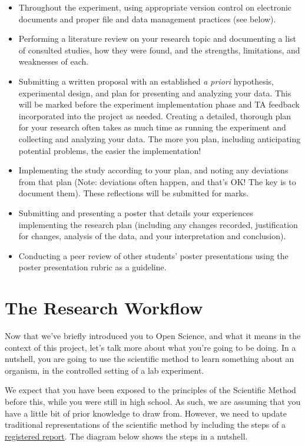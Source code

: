 \documentclass[
]{book}
\providecommand{\tightlist}{%
  \setlength{\itemsep}{0pt}\setlength{\parskip}{0pt}}
\begin{document}
\begin{itemize}
\tightlist
\item
  Throughout the experiment, using appropriate version control on electronic documents and proper file and data management practices (see below).
\item
  Performing a literature review on your research topic and documenting a list of consulted studies, how they were found, and the strengths, limitations, and weaknesses of each.
\item
  Submitting a written proposal with an established \emph{a priori} hypothesis, experimental design, and plan for presenting and analyzing your data. This will be marked before the experiment implementation phase and TA feedback incorporated into the project as needed. Creating a detailed, thorough plan for your research often takes as much time as running the experiment and collecting and analyzing your data. The more you plan, including anticipating potential problems, the easier the implementation!
\item
  Implementing the study according to your plan, and noting any deviations from that plan (Note: deviations often happen, and that's OK! The key is to document them). These reflections will be submitted for marks.
\item
  Submitting and presenting a poster that details your experiences implementing the research plan (including any changes recorded, justification for changes, analysis of the data, and your interpretation and conclusion).
\item
  Conducting a peer review of other students' poster presentations using the poster presentation rubric as a guideline.
\end{itemize}

\hypertarget{the-research-workflow}{%
\chapter*{The Research Workflow}\label{the-research-workflow}}

Now that we've briefly introduced you to Open Science, and what it means in the context of this project, let's talk more about what you're going to be doing. In a nutshell, you are going to use the scientific method to learn something about an organism, in the controlled setting of a lab experiment.

We expect that you have been exposed to the principles of the Scientific Method before this, while you were still in high school. As such, we are assuming that you have a little bit of prior knowledge to draw from. However, we need to update traditional representations of the scientific method by including the steps of a \href{https://www.cos.io/initiatives/registered-reports?_ga=2.246781956.1490314874.1630517054-739975224.1630517054}{registered report}. The diagram below shows the steps in a nutshell.
\end{document}
